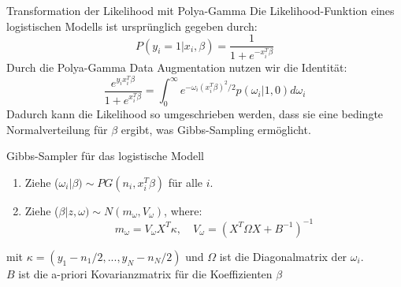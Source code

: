 \documentclass{beamer}
\begin{document}
\begin{frame}{Transformation der Likelihood mit Polya-Gamma}
	Die Likelihood-Funktion eines logistischen Modells ist ursprünglich gegeben durch:
	\begin{equation}
		P(y_i = 1 | x_i, \beta) = \frac{1}{1 + e^{-x_i^T \beta}}
	\end{equation}
	Durch die Polya-Gamma Data Augmentation nutzen wir die Identität:
	\begin{equation}
		\frac{e^{y_i x_i^T \beta}}{1 + e^{x_i^T \beta}} = \int_0^\infty e^{-\omega_i (x_i^T \beta)^2 / 2} p(\omega_i | 1, 0) d\omega_i
	\end{equation}
	Dadurch kann die Likelihood so umgeschrieben werden, dass sie eine bedingte Normalverteilung für $\beta$ ergibt, was Gibbs-Sampling ermöglicht.
\end{frame}




	\begin{frame}{Gibbs-Sampler für das logistische Modell}
		\begin{enumerate}
			\item Ziehe ($\omega_i | \beta) \sim PG(n_i, x_i^T \beta)$ für alle $i$.
			\item Ziehe ($\beta | z, \omega) \sim N(m_{\omega}, V_{\omega})$, where:
			\begin{equation}
				m_{\omega} = V_{\omega} X^T \kappa, \quad V_{\omega} = (X^T \Omega X + B^{-1})^{-1}
			\end{equation}
		\end{enumerate}
	mit $\kappa = (y_1-n_1/2,...,y_N-n_N/2)$ und $\Omega$ ist die Diagonalmatrix der $\omega_i$. \\ 
	$B$  ist die a-priori Kovarianzmatrix für die Koeffizienten  $\beta$ 
	\end{frame}
	
	
\end{document}
